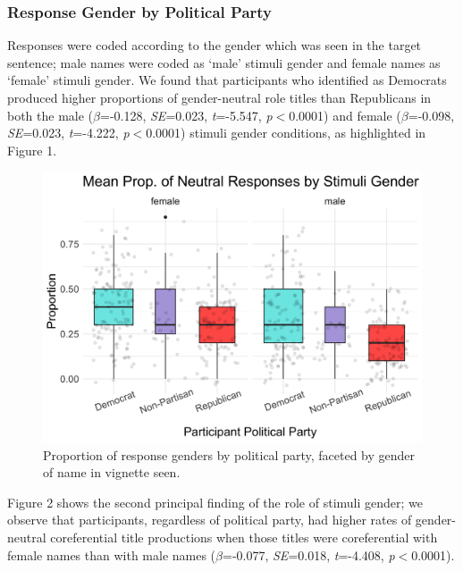 \documentclass[10pt,letterpaper]{article}
\begin{document}
	\subsubsection{Response Gender by Political Party}
	Responses were coded according to the gender which was seen in the target sentence; male names were coded as `male' stimuli gender and female names as `female' stimuli gender. We found that participants who identified as Democrats produced higher proportions of gender-neutral role titles than Republicans in both the male ($\beta$=-0.128, \textit{SE}=0.023, \textit{t}=-5.547, \textit{p}$<$0.0001) and female ($\beta$=-0.098, \textit{SE}=0.023, \textit{t}=-4.222, \textit{p}$<$0.0001) stimuli gender conditions, as highlighted in Figure 1.
	
	\begin{figure}[ht!]
		\centering
		\includegraphics[scale=0.115]{prod_neutral_poli_box.png}
		\caption{Proportion of response genders by political party, faceted by gender of name in vignette seen.}
		\label{prod-box}
	\end{figure}
	
	Figure 2 shows the second principal finding of the role of stimuli gender; we observe that participants, regardless of political party, had higher rates of gender-neutral coreferential title productions when those titles were coreferential with female names than with male names  ($\beta$=-0.077, \textit{SE}=0.018, \textit{t}=-4.408, \textit{p}$<$0.0001). 
	
\end{document}
